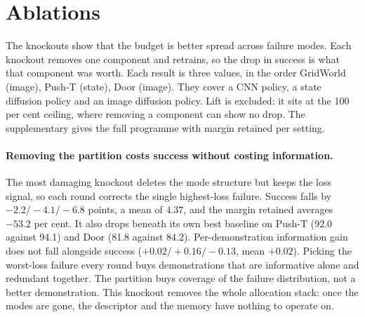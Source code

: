\section{Ablations}

The knockouts show that the budget is better spread across failure modes. Each
knockout removes one component and retrains, so the drop in success is what that
component was worth. Each result is three values, in the order GridWorld (image),
Push-T (state), Door (image). They cover a CNN policy, a state diffusion policy and
an image diffusion policy. Lift is excluded: it sits at the 100 per cent ceiling,
where removing a component can show no drop. The supplementary gives the full
programme with margin retained per setting.

\paragraph{Removing the partition costs success without costing information.}
The most damaging knockout deletes the mode structure but keeps the loss signal, so
each round corrects the single highest-loss failure. Success falls by
$-2.2 / -4.1 / -6.8$ points, a mean of $4.37$, and the margin retained averages
$-53.2$ per cent. It also drops beneath its own best baseline on Push-T (92.0
against 94.1) and Door (81.8 against 84.2). Per-demonstration information gain does
not fall alongside success ($+0.02 / +0.16 / -0.13$, mean $+0.02$). Picking the
worst-loss failure every round buys demonstrations that are informative alone and
redundant together. The partition buys coverage of the failure distribution, not a
better demonstration. This knockout removes the whole allocation stack: once the
modes are gone, the descriptor and the memory have nothing to operate on.


